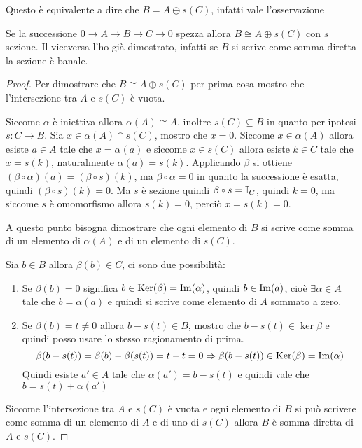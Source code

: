 Questo è equivalente a dire che $ B = A \oplus s(C) $, infatti vale l'osservazione
\begin{osservation}
  Se la successione $ 0 \to A \to B \to C \to 0 $ spezza allora $ B \cong A \oplus s(C) $ con $ s $ sezione.
  Il viceversa l'ho già dimostrato, infatti se $ B $ si scrive come somma diretta
  la sezione è banale.
\end{osservation}
\begin{proof}
  Per dimostrare che $ B \cong A \oplus s(C) $ per prima cosa mostro che l'intersezione
  tra $ A $ e $ s(C) $ è vuota.

  Siccome $ \alpha $ è iniettiva allora $ \alpha(A) \cong A $, inoltre
  $ s(C) \subseteq B $ in quanto per ipotesi $ s \colon C \to B $. Sia
  $ x \in \alpha(A) \cap s(C) $, mostro che $ x = 0
  $.%
  Siccome $ x \in \alpha(A) $ allora esiste $ a \in A $ tale che
  $ x = \alpha(a) $ e siccome $ x \in s(C) $ allora esiste $ k \in C $ tale che
  $ x = s(k) $, naturalmente $ \alpha(a) = s(k) $. Applicando $ \beta $ si ottiene
  $ (\beta \circ \alpha) (a) = (\beta \circ s)(k) $, ma
  $ \beta \circ \alpha = 0 $ in quanto la successione è esatta, quindi
  $ (\beta \circ s)(k) = 0 $. Ma $ s $ è sezione quindi
  $ \beta \circ s = \Id{C} $, quindi $ k = 0 $, ma siccome $ s $ è omomorfismo allora
  $ s(k) = 0 $, perciò $ x = s(k) = 0 $.

  A questo punto bisogna dimostrare che ogni elemento di $ B $ si scrive come somma
  di un elemento di $ \alpha(A) $ e di un elemento
  di $ s(C) $.

  Sia $ b \in B $ allora $ \beta(b) \in C $, ci sono due possibilità:
  \begin{enumerate}
  \item Se $ \beta(b) = 0 $ significa $ b \in \mathrm{Ker}( \beta) = \mathrm{Im}( \alpha ) $, quindi $ b \in \mathrm{Im}( a ) $, cioè
    $ \exists \alpha \in A $ tale che $ b = \alpha(a) $ e quindi si scrive come elemento di $ A $ sommato
    a zero.
  \item Se $ \beta(b) = t \not = 0 $ allora $ b - s(t) \in B $,
    mostro che $ b - s(t) \in \ker{\beta} $ e quindi posso usare lo stesso ragionamento
    di prima.
    \[
      \beta(b - s(t)) = \beta(b) - \beta(s(t)) = t - t = 0 \Rightarrow \beta(b - s(t)) \in \mathrm{Ker}( \beta) = \mathrm{Im}( \alpha )
    \]
    Quindi esiste $ a' \in A $ tale che $ \alpha(a') = b - s(t) $ e quindi
    vale che $ b = s(t) + \alpha(a') $
  \end{enumerate}
  Siccome l'intersezione tra $ A $ e $ s(C) $ è vuota e ogni elemento di $ B $
  si può scrivere come somma di un elemento di $ A $ e di uno di $ s(C) $ allora
  $ B $ è somma diretta di $ A $ e $ s(C) $.
\end{proof}
